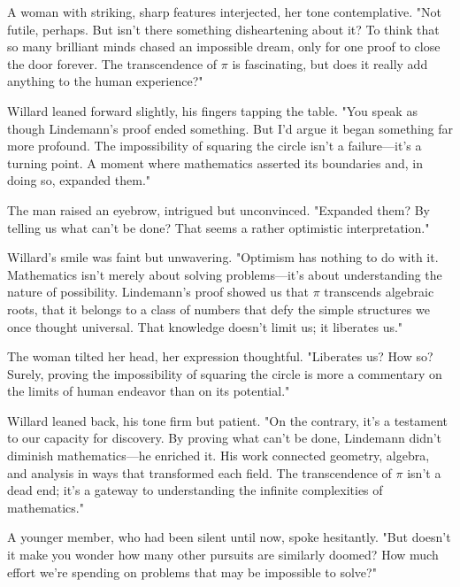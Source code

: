 \smallskip

A woman with striking, sharp features interjected, her tone contemplative.  
"Not futile, perhaps. But isn’t there something disheartening about it? To think that so many brilliant minds chased an impossible dream, only for one proof to close the door forever. The transcendence of \(\pi\) is fascinating, but does it really add anything to the human experience?"

\smallskip

Willard leaned forward slightly, his fingers tapping the table.  
"You speak as though Lindemann’s proof ended something. But I’d argue it began something far more profound. The impossibility of squaring the circle isn’t a failure—it’s a turning point. A moment where mathematics asserted its boundaries and, in doing so, expanded them."

\smallskip

The man raised an eyebrow, intrigued but unconvinced.  
"Expanded them? By telling us what can’t be done? That seems a rather optimistic interpretation."

\smallskip

Willard’s smile was faint but unwavering.  
"Optimism has nothing to do with it. Mathematics isn’t merely about solving problems—it’s about understanding the nature of possibility. Lindemann’s proof showed us that \(\pi\) transcends algebraic roots, that it belongs to a class of numbers that defy the simple structures we once thought universal. That knowledge doesn’t limit us; it liberates us."

\smallskip

The woman tilted her head, her expression thoughtful.  
"Liberates us? How so? Surely, proving the impossibility of squaring the circle is more a commentary on the limits of human endeavor than on its potential."

\smallskip

Willard leaned back, his tone firm but patient.  
"On the contrary, it’s a testament to our capacity for discovery. By proving what can’t be done, Lindemann didn’t diminish mathematics—he enriched it. His work connected geometry, algebra, and analysis in ways that transformed each field. The transcendence of \(\pi\) isn’t a dead end; it’s a gateway to understanding the infinite complexities of mathematics."

\smallskip

A younger member, who had been silent until now, spoke hesitantly.  
"But doesn’t it make you wonder how many other pursuits are similarly doomed? How much effort we’re spending on problems that may be impossible to solve?"

